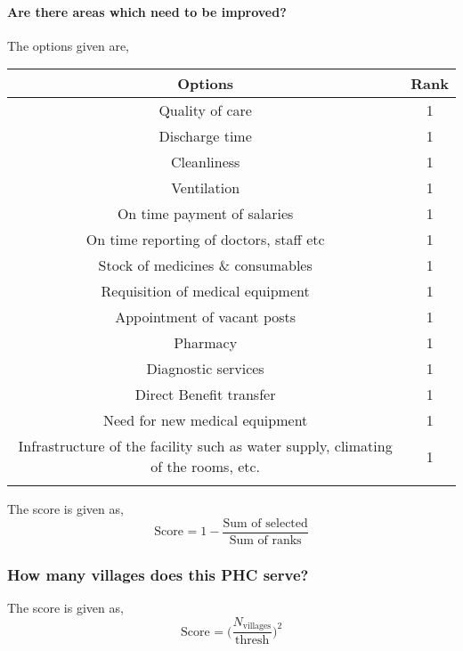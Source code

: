 \documentclass[oneside]{article}
\newcommand{\tsub}[2]{\text{#1}_{\text{#2}}}
\newcommand{\tsubb}[2]{#1_{\text{#2}}}
\newcommand{\dsub}[2]{\dfrac{\text{#1}}{\text{#2}}}
\newenvironment{ttable}
{
\begin{center}
\begin{tabular}{c|c}
\hline
}
{
\\ \hline
\end{tabular}
\end{center}
}
\begin{document}
\paragraph{ Are there areas which need to be improved?}
The options given are,
\begin{ttable}
Options & Rank \\ \hline
Quality of care & 1 \\
Discharge time & 1 \\
Cleanliness & 1 \\
Ventilation & 1 \\
On time payment of salaries & 1 \\
On time reporting of doctors, staff etc & 1 \\
Stock of medicines \& consumables & 1 \\
Requisition of medical equipment & 1 \\
Appointment of vacant posts & 1 \\
Pharmacy & 1 \\
Diagnostic services & 1 \\
Direct Benefit transfer & 1 \\
Need for new medical equipment & 1 \\
Infrastructure of the facility such as water supply, climating of the rooms, etc. & 1 \\
\hline
\end{ttable}
The score is given as,
\[
	\tsub{Score}{} = 1 - \dsub{Sum of selected}{Sum of ranks}
\]
\subsubsection{How many villages does this PHC serve?}
The score is given as,
\[
	\tsub{Score}{} = \Big(\dfrac{\tsubb{N}{villages}}{\text{thresh}}\Big)^{2}
\]
\subsubsection{}
\end{document}
